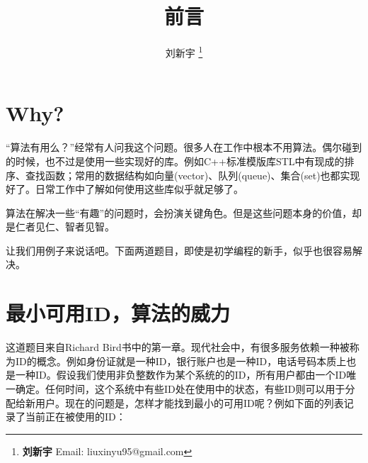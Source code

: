 \documentclass[UTF8]{article}
\begin{document}


\title{前言}

\author{刘新宇
\thanks{{\bfseries 刘新宇} \newline
  Email: liuxinyu95@gmail.com \newline}
  }

\maketitle
\fi


\section{Why?}
\label{why}

“算法有用么？”经常有人问我这个问题。很多人在工作中根本不用算法。偶尔碰到的时候，也不过是使用一些实现好的库。例如C++标准模版库STL中有现成的排序、查找函数；常用的数据结构如向量(vector)、队列(queue)、集合(set)也都实现好了。日常工作中了解如何使用这些库似乎就足够了。

算法在解决一些“有趣”的问题时，会扮演关键角色。但是这些问题本身的价值，却是仁者见仁、智者见智。

让我们用例子来说话吧。下面两道题目，即使是初学编程的新手，似乎也很容易解决。

\section{最小可用ID，算法的威力}
\label{min-free} 

这道题目来自Richard Bird书中的第一章\cite{Bird-book}。现代社会中，有很多服务依赖一种被称为ID的概念。例如身份证就是一种ID，银行账户也是一种ID，电话号码本质上也是一种ID。假设我们使用非负整数作为某个系统的的ID，所有用户都由一个ID唯一确定。任何时间，这个系统中有些ID处在使用中的状态，有些ID则可以用于分配给新用户。现在的问题是，怎样才能找到最小的可用ID呢？例如下面的列表记录了当前正在被使用的ID：
\end{document}
